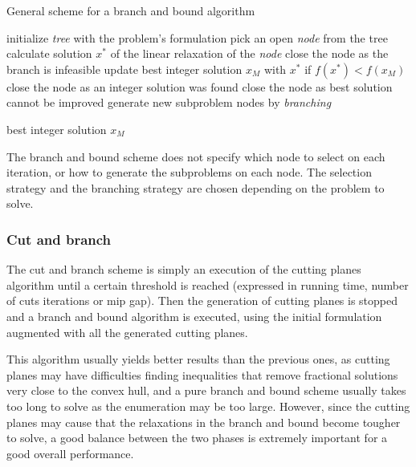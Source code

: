 \begin{algorithm}
\caption{General scheme for a branch and bound algorithm}
\label{alg:branchnbound}

\begin{algorithmic}

\STATE initialize \textit{tree} with the problem's formulation
\STATE 
{}
	\STATE pick an open \textit{node} from the tree
	\STATE calculate solution $x^*$ of the linear relaxation of the \textit{node}
		\STATE close the node as the branch is infeasible
		\STATE update best integer solution $x_M$ with $x^*$ if $f(x^*) < f(x_M)$
		\STATE close the node as an integer solution was found
		\STATE close the node as best solution cannot be improved
	\ELSE
		\STATE generate new subproblem nodes by \textit{branching}
	\ENDIF
\ENDWHILE

\RETURN best integer solution $x_M$

\end{algorithmic}
\end{algorithm}

The branch and bound scheme does not specify which node to select on each iteration, or how to generate the subproblems on each node. The selection strategy and the branching strategy are chosen depending on the problem to solve.

\subsubsection*{Cut and branch}

The cut and branch scheme is simply an execution of the cutting planes algorithm until a certain threshold is reached (expressed in running time, number of cuts iterations or mip gap). Then the generation of cutting planes is stopped and a branch and bound algorithm is executed, using the initial formulation augmented with all the generated cutting planes.

This algorithm usually yields better results than the previous ones, as cutting planes may have difficulties finding inequalities that remove fractional solutions very close to the convex hull, and a pure branch and bound scheme usually takes too long to solve as the enumeration may be too large. However, since the cutting planes may cause that the relaxations in the branch and bound become tougher to solve, a good balance between the two phases is extremely important for a good overall performance.

